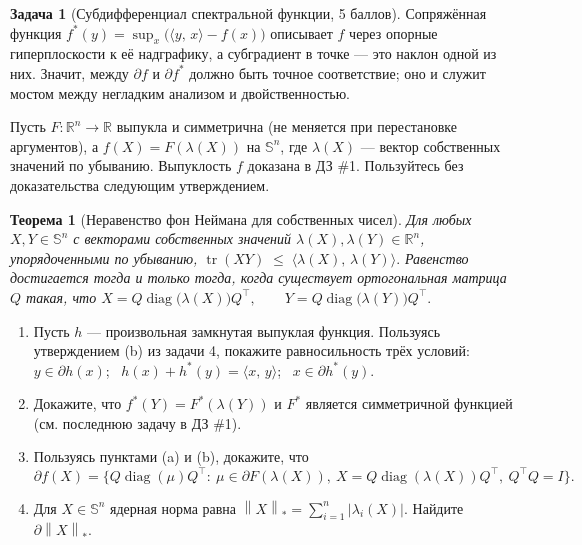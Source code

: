 \documentclass[11pt]{article}
\theoremstyle{definition}
\newtheorem{problem}{Задача}
\theoremstyle{starred}
\theoremstyle{definition}
\theoremstyle{remark}
\theoremstyle{plain}
\newtheorem*{theorem*}{Теорема}
\theoremstyle{definition}
\DeclareMathOperator{\tr}{tr}
\DeclareMathOperator{\diag}{diag}
\newcommand{\R}{\mathbb{R}}
\newcommand{\Sym}{\mathbb{S}}
\newcommand{\norm}[1]{\left\lVert #1 \right\rVert}
\newcommand{\iprod}[2]{\langle #1,\, #2 \rangle}
\newcommand{\pd}{\partial}
\begin{document}
\begin{problem}[Субдифференциал спектральной функции, 5 баллов]
Сопряжённая функция $f^{*}(y) = \sup_x\bigl(\iprod{y}{x} - f(x)\bigr)$ описывает $f$ через опорные
гиперплоскости к её надграфику, а субградиент в точке --- это наклон одной из них. Значит, между
$\pd f$ и $\pd f^{*}$ должно быть точное соответствие; оно и служит мостом между негладким анализом
и двойственностью.

Пусть $F \colon \R^{n} \to \R$ выпукла и симметрична (не меняется при перестановке аргументов), а
$f(X) = F(\lambda(X))$ на $\Sym^{n}$, где $\lambda(X)$ --- вектор собственных значений по убыванию.
Выпуклость $f$ доказана в ДЗ \#1. Пользуйтесь без доказательства следующим утверждением.

\begin{theorem*}[Неравенство фон Неймана для собственных чисел]
Для любых $X, Y \in \Sym^{n}$ с векторами собственных значений $\lambda(X), \lambda(Y)\in \R^n$,
упорядоченными по убыванию, $\tr(XY) \;\le\; \iprod{\lambda(X)}{\lambda(Y)} . $ Равенство достигается тогда и только тогда, когда существует ортогональная матрица $Q$ такая, что
$X = Q\diag\bigl(\lambda(X)\bigr)Q^{\top}, \qquad Y = Q\diag\bigl(\lambda(Y)\bigr)Q^{\top}.$

\end{theorem*}

\begin{enumerate}[label=(\alph*), nosep]
  \item Пусть $h$ --- произвольная замкнутая выпуклая функция. Пользуясь утверждением (b) из задачи 4, покажите
        равносильность трёх условий: $y \in \pd h(x)$; \ $h(x) + h^{*}(y) = \iprod{x}{y}$; \
        $x \in \pd h^{*}(y)$.
  \item Докажите, что $f^{*}(Y) = F^{*}(\lambda(Y))$ и $F^*$ является симметричной функцией (см. последнюю задачу в ДЗ  \#1).
  \item Пользуясь пунктами (a) и (b), докажите, что
        \[
        \pd f(X) = \bigl\{Q \diag(\mu) Q^{\top} :\ \mu \in \pd F(\lambda(X)),\
        X = Q\diag(\lambda(X))Q^{\top},\ Q^{\top}Q = I\bigr\}.
        \]
  \item Для $X \in \Sym^{n}$ ядерная норма равна $\norm{X}_{*} = \sum_{i=1}^{n}|\lambda_i(X)|$.
        Найдите $\pd\norm{X}_{*}$.
\end{enumerate}
\end{problem}
\end{document}
